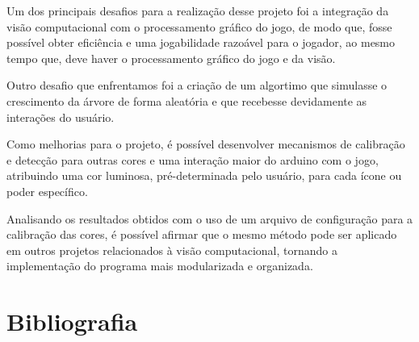\documentclass[12pt]{article}
\begin{document}
Um dos principais desafios para a realiza\c c\~ao desse projeto foi a integra\c c\~ao da vis\~ao
computacional com o processamento gr\'afico do jogo, de modo que, fosse poss\'ivel obter efici\^encia
e uma jogabilidade razo\'avel para o jogador, ao mesmo tempo que, deve haver o processamento gr\'afico do jogo e da vis\~ao.

Outro desafio que enfrentamos foi a cria\c c\~ao de um algortimo que simulasse o crescimento
da \'arvore de forma aleat\'oria e que recebesse devidamente as intera\c c\~oes do usu\'ario.

Como melhorias para o projeto, \'e poss\'ivel desenvolver mecanismos de calibra\c c\~ao
e detec\c c\~ao para outras cores e uma intera\c c\~ao maior do arduino com o jogo, atribuindo uma
cor luminosa, pr\'e-determinada pelo usu\'ario, para cada \'icone ou poder espec\'ifico.

Analisando os resultados obtidos com o uso de um arquivo de configura\c c\~ao para a 
calibra\c c\~ao das cores, \'e poss\'ivel afirmar que o mesmo m\'etodo pode ser aplicado em
outros projetos relacionados \`a vis\~ao computacional, tornando a implementa\c c\~ao do programa mais modularizada e organizada.

\nocite{*}

\section{Bibliografia}


\end{document}

